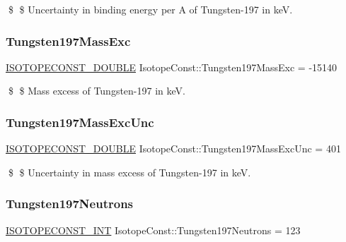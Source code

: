 \$ \$ Uncertainty in binding energy per A of Tungsten-\/197 in keV. \mbox{\label{group___isotope_const-_tungsten-_w197_ga9f95faf5eff688935a463c5611be22b5}} 
\subsubsection{\texorpdfstring{Tungsten197\+Mass\+Exc}{Tungsten197MassExc}}
{\footnotesize\ttfamily \mbox{\hyperlink{group___isotope_const-_macros_ga8f45a7272ce02c0b4c65c44636ed719a}{I\+S\+O\+T\+O\+P\+E\+C\+O\+N\+S\+T\+\_\+\+D\+O\+U\+B\+LE}} Isotope\+Const\+::\+Tungsten197\+Mass\+Exc = -\/15140}

\$ \$ Mass excess of Tungsten-\/197 in keV. \mbox{\label{group___isotope_const-_tungsten-_w197_ga040ab718bf979a399a9ea15acd1c24eb}} 
\subsubsection{\texorpdfstring{Tungsten197\+Mass\+Exc\+Unc}{Tungsten197MassExcUnc}}
{\footnotesize\ttfamily \mbox{\hyperlink{group___isotope_const-_macros_ga8f45a7272ce02c0b4c65c44636ed719a}{I\+S\+O\+T\+O\+P\+E\+C\+O\+N\+S\+T\+\_\+\+D\+O\+U\+B\+LE}} Isotope\+Const\+::\+Tungsten197\+Mass\+Exc\+Unc = 401}

\$ \$ Uncertainty in mass excess of Tungsten-\/197 in keV. \mbox{\label{group___isotope_const-_tungsten-_w197_gaa2d68d99b240ed7603ce8fdc0e141cf1}} 
\subsubsection{\texorpdfstring{Tungsten197\+Neutrons}{Tungsten197Neutrons}}
{\footnotesize\ttfamily \mbox{\hyperlink{group___isotope_const-_macros_ga5f18360b3e99483a35c32d789e62621c}{I\+S\+O\+T\+O\+P\+E\+C\+O\+N\+S\+T\+\_\+\+I\+NT}} Isotope\+Const\+::\+Tungsten197\+Neutrons = 123}

